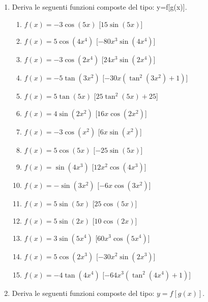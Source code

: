 \begin{enumerate}
\item Deriva le seguenti funzioni composte del tipo: y=f[g(x)].

\begin{enumerate}
\item \(f(x) = - 3 \cos{\left (5 x \right )}\) \hfill [\(15 \sin{\left (5 x 
\right )}\)]
\item \(f(x) = 5 \cos{\left (4 x^{4} \right )}\) \hfill [\(- 80 x^{3} \sin{\left 
(4 x^{4} \right )}\)]
\item \(f(x) = - 3 \cos{\left (2 x^{4} \right )}\) \hfill [\(24 x^{3} \sin{\left 
(2 x^{4} \right )}\)]
\item \(f(x) = - 5 \tan{\left (3 x^{2} \right )}\) \hfill [\(- 30 x 
\left(\tan^{2}{\left (3 x^{2} \right )} + 1\right)\)]
\item \(f(x) = 5 \tan{\left (5 x \right )}\) \hfill [\(25 \tan^{2}{\left (5 x 
\right )} + 25\)]
\item \(f(x) = 4 \sin{\left (2 x^{2} \right )}\) \hfill [\(16 x \cos{\left (2 
x^{2} \right )}\)]
\item \(f(x) = - 3 \cos{\left (x^{2} \right )}\) \hfill [\(6 x \sin{\left (x^{2} 
\right )}\)]
\item \(f(x) = 5 \cos{\left (5 x \right )}\) \hfill [\(- 25 \sin{\left (5 x 
\right )}\)]
\item \(f(x) = \sin{\left (4 x^{3} \right )}\) \hfill [\(12 x^{2} \cos{\left (4 
x^{3} \right )}\)]
\item \(f(x) = - \sin{\left (3 x^{2} \right )}\) \hfill [\(- 6 x \cos{\left (3 
x^{2} \right )}\)]
\item \(f(x) = 5 \sin{\left (5 x \right )}\) \hfill [\(25 \cos{\left (5 x \right 
)}\)]
\item \(f(x) = 5 \sin{\left (2 x \right )}\) \hfill [\(10 \cos{\left (2 x \right 
)}\)]
\item \(f(x) = 3 \sin{\left (5 x^{4} \right )}\) \hfill [\(60 x^{3} \cos{\left 
(5 x^{4} \right )}\)]
\item \(f(x) = 5 \cos{\left (2 x^{3} \right )}\) \hfill [\(- 30 x^{2} \sin{\left 
(2 x^{3} \right )}\)]
\item \(f(x) = - 4 \tan{\left (4 x^{4} \right )}\) \hfill [\(- 64 x^{3} 
\left(\tan^{2}{\left (4 x^{4} \right )} + 1\right)\)]
 \end{enumerate}


\item Deriva le seguenti funzioni composte del tipo: \(y=f[g(x)]\).


\end{enumerate}

